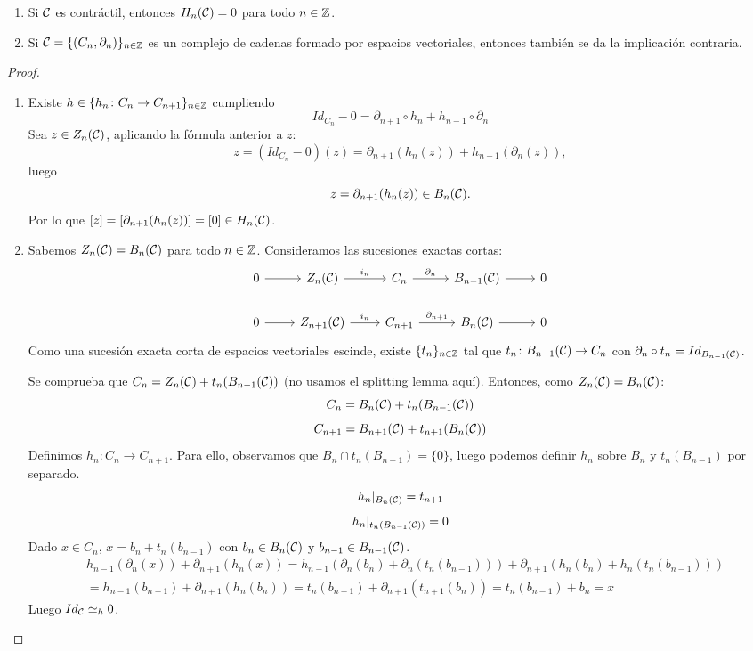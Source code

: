 \documentclass[HS.tex]{subfiles}
\begin{document}
\begin{prop}\mbox{}
\begin{enumerate}
\item Si $\mathcal{C}$ es contráctil, entonces $H_n(\mathcal{C}) = 0$ para todo $n \in \mathbb{Z}$.
\item Si $\mathcal{C} = \{(C_n,\partial_n)\}_{n \in \mathbb{Z}}$ es un complejo de cadenas formado por espacios vectoriales, entonces también se da la implicación contraria.
\end{enumerate}
\end{prop}
\begin{proof}\
\begin{enumerate}
\item Existe $h \in \{h_n \colon C_n \to C_{n+1}\}_{n \in \mathbb{Z}}$ cumpliendo 
\[ Id_{C_n}-0 = \partial_{n+1} \circ h_n + h_{n-1} \circ \partial_n \]
Sea $z \in Z_n(\mathcal{C})$, aplicando la fórmula anterior a $z$:
\[ z=(Id_{C_n}-0)(z) = \partial_{n+1}(h_n(z)) + h_{n-1}(\partial_n(z)), \]
luego
\[ z = \partial_{n+1}(h_n(z)) \in B_n(\mathcal{C}). \]
Por lo que $[z] = [\partial_{n+1}(h_n(z))] = [0] \in H_n(\mathcal{C})$.

\item Sabemos $Z_n(\mathcal{C}) = B_n(\mathcal{C})$ para todo $n \in \mathbb{Z}$.
Consideramos las sucesiones exactas cortas:
\[
\begin{tikzcd}
0 \arrow[r] & Z_n(\CC) \arrow[r,"i_n"] & C_n \arrow[r,"\partial_n"] & B_{n-1}(\CC)\arrow[r] &  0\\
0 \arrow[r] & Z_{n+1}(\CC) \arrow[r,"i_n"] & C_{n+1} \arrow[r,"\partial_{n+1}"] & B_n(\CC) \arrow[r]&  0
\end{tikzcd}
\]
Como una sucesión exacta corta de espacios vectoriales escinde, existe $\{t_n\}_{n \in \mathbb{Z}}$ tal que $t_n \colon B_{n-1}(\mathcal{C}) \to C_n$ con $\partial_n \circ t_n = Id_{B_{n-1}(\mathcal{C})}$.

Se comprueba que $C_n = Z_n(\mathcal{C}) + t_n(B_{n-1}(\mathcal{C}))$ (no usamos el splitting lemma aquí).
Entonces, como $Z_n(\mathcal{C}) = B_n(\mathcal{C})$:
\[ C_n = B_n(\mathcal{C}) + t_n(B_{n-1}(\mathcal{C})) \]
\[ C_{n+1}= B_{n+1}(\mathcal{C}) + t_{n+1}(B_n(\mathcal{C})) \]
Definimos $h_n \colon C_n \to C_{n+1}$. Para ello, observamos que $B_n \cap t_n(B_{n-1}) = \{0\}$, luego podemos definir $h_n$ sobre $B_n$ y $t_n(B_{n-1})$ por separado.
\[ h_n|_{B_n(\mathcal{C})} = t_{n+1} \]
\[ h_n|_{t_n(B_{n-1}(\mathcal{C}))} = 0 \]
Dado $x \in C_n$, $x = b_n + t_n(b_{n-1})$ con $b_n \in B_n(\mathcal{C})$ y $b_{n-1} \in B_{n-1}(\mathcal{C})$.
\begin{align*}
& h_{n-1}(\partial_n(x)) + \partial_{n+1}(h_n(x)) = h_{n-1}(\partial_n(b_n)+\partial_n(t_n(b_{n-1}))) + \partial_{n+1}(h_n(b_n)+h_n(t_n(b_{n-1}))) \\
& = h_{n-1}(b_{n-1}) + \partial_{n+1}(h_n(b_n)) = t_n(b_{n-1}) + \partial_{n+1}(t_{n+1}(b_n)) = t_n(b_{n-1})+b_n = x
\end{align*}
Luego $Id_{\mathcal{C}} \simeq_h 0$.
\end{enumerate}
\end{proof}
\end{document}
